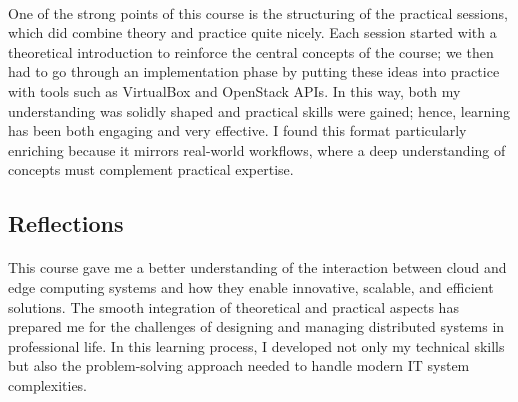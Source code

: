\paragraph{}One of the strong points of this course is the structuring of the practical sessions, which did combine theory and practice quite nicely. Each session started with a theoretical introduction to reinforce the central concepts of the course; we then had to go through an implementation phase by putting these ideas into practice with tools such as VirtualBox and OpenStack APIs. In this way, both my understanding was solidly shaped and practical skills were gained; hence, learning has been both engaging and very effective. I found this format particularly enriching because it mirrors real-world workflows, where a deep understanding of concepts must complement practical expertise.

\subsection{Reflections}
\paragraph{}This course gave me a better understanding of the interaction between cloud and edge computing systems and how they enable innovative, scalable, and efficient solutions. The smooth integration of theoretical and practical aspects has prepared me for the challenges of designing and managing distributed systems in professional life. In this learning process, I developed not only my technical skills but also the problem-solving approach needed to handle modern IT system complexities.